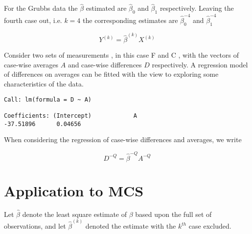 \documentclass[12pt, a4paper]{article}
\begin{document}
For the Grubbs data the $\hat{\beta}$ estimated are $\hat{\beta}_{0}$ and $\hat{\beta}_{1}$ respectively. Leaving the
fourth case out, i.e. $k=4$ the corresponding estimates are $\hat{\beta}_{0}^{-4}$ and $\hat{\beta}_{1}^{-4}$

\begin{equation}
Y^{(k)} = \hat{\beta}^{(k)}X^{(k)}
\end{equation}

Consider two sets of measurements , in this case F and C , with the vectors of case-wise averages $A$ and case-wise differences $D$ respectively. A regression model of differences on averages can be fitted with the view to exploring some characteristics of the data.

\begin{verbatim}
Call: lm(formula = D ~ A)

Coefficients: (Intercept)            A
-37.51896      0.04656

\end{verbatim}




When considering the regression of case-wise differences and averages, we write

\begin{equation}
D^{-Q} = \hat{\beta}^{-Q}A^{-Q}
\end{equation}


\section{Application to MCS} %
	
Let $\hat{\beta}$ denote the least square estimate of $\beta$ based upon the full set of observations, and let
$\hat{\beta}^{(k)}$ denoted the estimate with the $k^{th}$ case	excluded.
\end{document}
